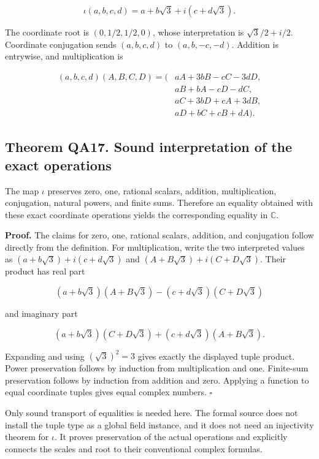 \[
\iota(a,b,c,d)=a+b\sqrt3+i(c+d\sqrt3).
\]

The coordinate root is \((0,1/2,1/2,0)\), whose interpretation is
\(\sqrt3/2+i/2\). Coordinate conjugation sends \((a,b,c,d)\) to
\((a,b,-c,-d)\). Addition is entrywise, and multiplication is

\[
\begin{aligned}
(a,b,c,d)(A,B,C,D)=\big(&aA+3bB-cC-3dD,\\
&aB+bA-cD-dC,\\
&aC+3bD+cA+3dB,\\
&aD+bC+cB+dA\big).
\end{aligned}
\]

\hypertarget{q:theorem-qa17.-sound-interpretation-of-the-exact-operations}{%
\subsection*{Theorem QA17. Sound interpretation of the exact
operations}\label{q:theorem-qa17.-sound-interpretation-of-the-exact-operations}}

The map \(\iota\) preserves zero, one, rational scalars, addition,
multiplication, conjugation, natural powers, and finite sums. Therefore
an equality obtained with these exact coordinate operations yields the
corresponding equality in \(\mathbb C\).

\textbf{Proof.} The claims for zero, one, rational scalars, addition,
and conjugation follow directly from the definition. For multiplication,
write the two interpreted values as \((a+b\sqrt3)+i(c+d\sqrt3)\) and
\((A+B\sqrt3)+i(C+D\sqrt3)\). Their product has real part

\[
(a+b\sqrt3)(A+B\sqrt3)-(c+d\sqrt3)(C+D\sqrt3)
\]

and imaginary part

\[
(a+b\sqrt3)(C+D\sqrt3)+(c+d\sqrt3)(A+B\sqrt3).
\]

Expanding and using \((\sqrt3)^2=3\) gives exactly the displayed tuple
product. Power preservation follows by induction from multiplication and
one. Finite-sum preservation follows by induction from addition and
zero. Applying a function to equal coordinate tuples gives equal complex
numbers. \(\square\)

Only sound transport of equalities is needed here. The formal source
does not install the tuple type as a global field instance, and it does
not need an injectivity theorem for \(\iota\). It proves preservation of
the actual operations and explicitly connects the scales and root to
their conventional complex formulas.

